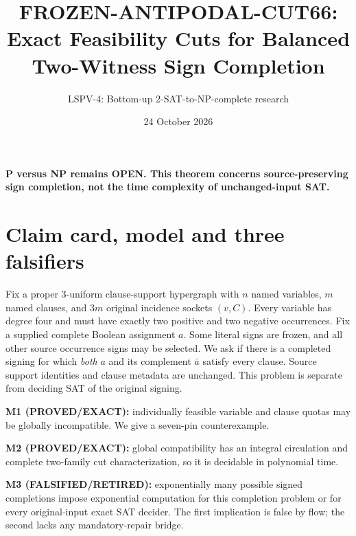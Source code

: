 \documentclass[11pt]{article}
\title{FROZEN-ANTIPODAL-CUT66: Exact Feasibility Cuts for Balanced Two-Witness Sign Completion}
\author{LSPV-4: Bottom-up 2-SAT-to-NP-complete research}
\date{24 October 2026}
\begin{document}
\maketitle
\begin{center}\textbf{P versus NP remains OPEN. This theorem concerns source-preserving sign completion, not the time complexity of unchanged-input SAT.}\end{center}
\section{Claim card, model and three falsifiers}
Fix a proper 3-uniform clause-support hypergraph with $n$ named variables, $m$ named clauses, and $3m$ original incidence sockets $(v,C)$. Every variable has degree four and must have exactly two positive and two negative occurrences. Fix a supplied complete Boolean assignment $a$. Some literal signs are frozen, and all other source occurrence signs may be selected. We ask if there is a completed signing for which \emph{both} $a$ and its complement $\bar a$ satisfy every clause. Source support identities and clause metadata are unchanged. This problem is separate from deciding SAT of the original signing.
\par\noindent \textbf{M1 (PROVED/EXACT):} individually feasible variable and clause quotas may be globally incompatible. We give a seven-pin counterexample.
\par\noindent \textbf{M2 (PROVED/EXACT):} global compatibility has an integral circulation and complete two-family cut characterization, so it is decidable in polynomial time.
\par\noindent \textbf{M3 (FALSIFIED/RETIRED):} exponentially many possible signed completions impose exponential computation for this completion problem or for every original-input exact SAT decider. The first implication is false by flow; the second lacks any mandatory-repair bridge.
\end{document}
